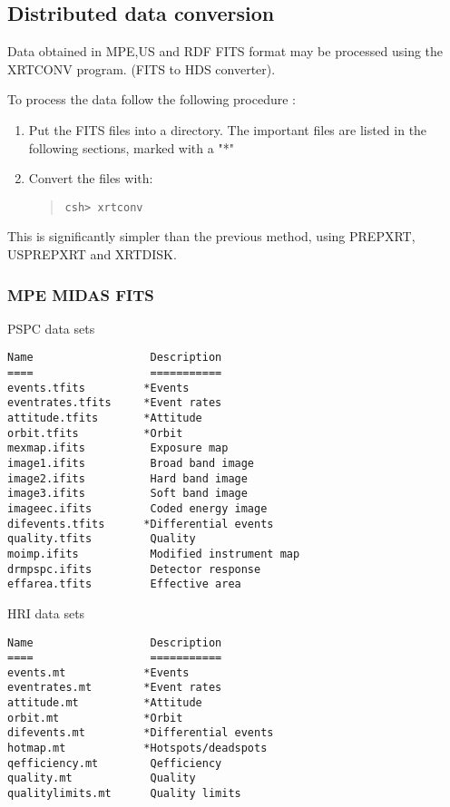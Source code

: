\documentclass{book}
\renewcommand{\_}{{\tt\char'137}}     %
\begin{document}
\subsection{Distributed data conversion}
Data obtained in MPE,US and RDF FITS format may be processed
using the XRTCONV program. (FITS to HDS converter).

To process the data follow the following procedure :

\begin{enumerate}
\item Put the FITS files into a directory. The important files are listed
in the following sections, marked with a "*"
\item Convert the files with:
\begin{quote}\begin{verbatim}
csh> xrtconv
\end{verbatim}\end{quote}
\end{enumerate}
This is significantly simpler than the previous method, using
PREPXRT, USPREPXRT and XRTDISK.

\subsubsection{MPE MIDAS FITS}
PSPC data sets
\begin{verbatim}
Name                  Description
====                  ===========
events.tfits         *Events
eventrates.tfits     *Event rates
attitude.tfits       *Attitude
orbit.tfits          *Orbit
mexmap.ifits          Exposure map
image1.ifits          Broad band image
image2.ifits          Hard band image
image3.ifits          Soft band image
imageec.ifits         Coded energy image
difevents.tfits      *Differential events
quality.tfits         Quality
moimp.ifits           Modified instrument map
drmpspc.ifits         Detector response
effarea.tfits         Effective area
\end{verbatim}
HRI data sets
\begin{verbatim}
Name                  Description
====                  ===========
events.mt            *Events
eventrates.mt        *Event rates
attitude.mt          *Attitude
orbit.mt             *Orbit
difevents.mt         *Differential events
hotmap.mt            *Hotspots/deadspots
qefficiency.mt        Qefficiency
quality.mt            Quality
qualitylimits.mt      Quality limits
\end{verbatim}
\end{document}
